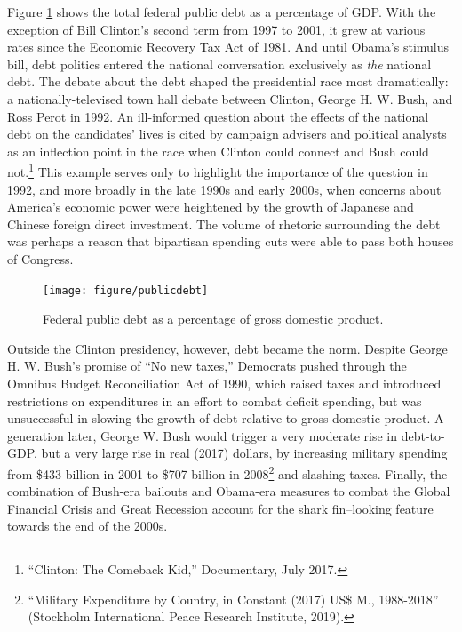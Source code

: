 \documentclass[12pt,oneside]{psthesis}
\begin{document}
Figure \ref{fig:publicdebt} shows the total federal public debt as a percentage of GDP.
With the exception of Bill Clinton's second term from 1997 to 2001, it grew at various rates since the Economic Recovery Tax Act of 1981.
And until Obama's stimulus bill, debt politics entered the national conversation exclusively as \emph{the} national debt.
The debate about the debt shaped the presidential race most dramatically: a nationally-televised town hall debate between Clinton, George H. W. Bush, and Ross Perot in 1992.
An ill-informed question about the effects of the national debt on the candidates' lives is cited by campaign advisers and political analysts as an inflection point in the race when Clinton could connect and Bush could not.\footnote{``Clinton: The Comeback Kid,'' Documentary, July 2017.}
This example serves only to highlight the importance of the question in 1992, and more broadly in the late 1990s and early 2000s, when concerns about America's economic power were heightened by the growth of Japanese and Chinese foreign direct investment.
The volume of rhetoric surrounding the debt was perhaps a reason that bipartisan spending cuts were able to pass both houses of Congress.
\begin{figure}

{\centering \texttt{[image: figure/publicdebt]} 

}

\caption{Federal public debt as a percentage of gross domestic product.}\label{fig:publicdebt}
\end{figure}
Outside the Clinton presidency, however, debt became the norm.
Despite George H. W. Bush's promise of ``No new taxes,'' Democrats pushed through the Omnibus Budget Reconciliation Act of 1990, which raised taxes and introduced restrictions on expenditures in an effort to combat deficit spending, but was unsuccessful in slowing the growth of debt relative to gross domestic product.
A generation later, George W. Bush would trigger a very moderate rise in debt-to-GDP, but a very large rise in real (2017) dollars, by increasing military spending from \$433 billion in 2001 to \$707 billion in 2008\footnote{``Military Expenditure by Country, in Constant (2017) US\$ M., 1988-2018'' (Stockholm International Peace Research Institute, 2019).} and slashing taxes.
Finally, the combination of Bush-era bailouts and Obama-era measures to combat the Global Financial Crisis and Great Recession account for the shark fin--looking feature towards the end of the 2000s.
\end{document}
